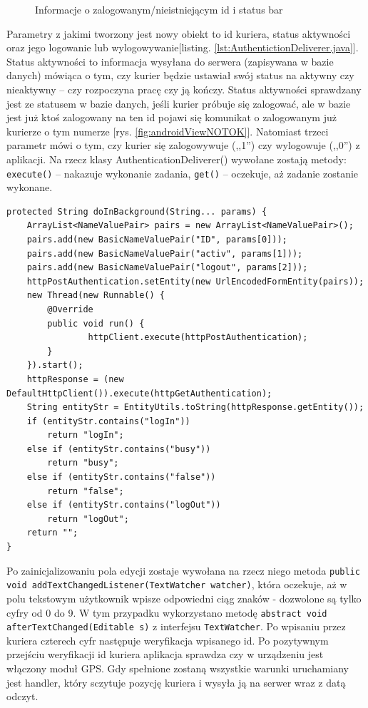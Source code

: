 \documentclass[eng,printmode,oneside]{mgr}
\begin{document}
\begin{figure}[ht]
{\label{fig:androidViewtask}
}
\caption{Informacje o zalogowanym/nieistniejącym id i status bar}
\end{figure}

Parametry z jakimi tworzony jest
nowy obiekt to id kuriera, status aktywności oraz jego logowanie lub
wylogowywanie[listing. \ref{lst:AuthentictionDeliverer.java}]. Status aktywności to
informacja wysyłana do serwera (zapisywana w bazie danych) mówiąca o tym, czy kurier będzie ustawiał swój status na aktywny
czy nieaktywny -- czy rozpoczyna pracę czy ją kończy. Status aktywności
sprawdzany jest ze statusem w bazie danych, jeśli kurier próbuje się zalogować,
ale w bazie jest już ktoś zalogowany na ten id pojawi się komunikat o
zalogowanym już kurierze o tym numerze [rys. \ref{fig:androidViewNOTOK}].
Natomiast trzeci parametr mówi o tym, czy kurier się zalogowywuje (,,1'') czy
wylogowuje (,,0'') z aplikacji. Na rzecz klasy AuthenticationDeliverer()
wywołane zostają metody:
\texttt{execute()} -- nakazuje wykonanie zadania, \texttt{get()} -- oczekuje, aż
zadanie zostanie wykonane.

\begin{lstlisting}[caption=klasa
AuthenticationDeliverer metoda
doInBackground,label=lst:AuthentictionDeliverer.java]
protected String doInBackground(String... params) {
	ArrayList<NameValuePair> pairs = new ArrayList<NameValuePair>();
	pairs.add(new BasicNameValuePair("ID", params[0]));
	pairs.add(new BasicNameValuePair("activ", params[1]));
	pairs.add(new BasicNameValuePair("logout", params[2]));
	httpPostAuthentication.setEntity(new UrlEncodedFormEntity(pairs));
	new Thread(new Runnable() {
		@Override
		public void run() {
				httpClient.execute(httpPostAuthentication);
		}
	}).start();
	httpResponse = (new DefaultHttpClient()).execute(httpGetAuthentication);
	String entityStr = EntityUtils.toString(httpResponse.getEntity());
	if (entityStr.contains("logIn"))
		return "logIn";
	else if (entityStr.contains("busy"))
		return "busy";
	else if (entityStr.contains("false"))
		return "false";
	else if (entityStr.contains("logOut"))
		return "logOut";
	return "";
}
\end{lstlisting}

Po zainicjalizowaniu pola edycji zostaje wywołana na rzecz niego metoda
\texttt{public void addTextChangedListener(TextWatcher watcher)}, która
oczekuje, aż w polu tekstowym użytkownik wpisze odpowiedni ciąg znaków -
dozwolone są tylko cyfry od 0 do 9.
W tym przypadku wykorzystano metodę \texttt{abstract void
afterTextChanged(Editable s)} z interfejsu \texttt{TextWatcher}. Po wpisaniu
przez kuriera czterech cyfr następuje weryfikacja wpisanego id. Po pozytywnym
przejściu weryfikacji id kuriera aplikacja sprawdza czy w urządzeniu jest
włączony moduł GPS. Gdy spełnione zostaną wszystkie warunki uruchamiany jest
handler, który sczytuje pozycję kuriera i wysyła ją na serwer wraz z datą odczyt. 
\end{document}
